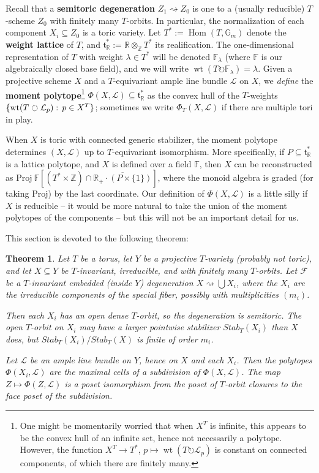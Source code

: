 \documentclass[11pt]{amsart}
\newtheorem{theorem}[Thm]{Theorem}
\theoremstyle{definition}
\DeclareMathOperator{\wt}{wt}
\DeclareMathOperator{\Hom}{Hom}
\newcommand{\RR}{\mathbb{R}}
\newcommand{\ZZ}{\mathbb{Z}}
\newcommand\defn[1]{{\bf #1}}
\newcommand\Union\bigcup
\newcommand\lie[1]{{\mathfrak #1}}
\newcommand\FF{{\mathbb F}}
\newcommand\tensor\otimes
\newcommand\calF{{\mathcal F}}
\newcommand\calL{{\mathcal L}}
\newcommand\Gm{{\mathbb G}_m}
\newcommand\actson\circlearrowright
\renewcommand{\colon}{\mathrel{:}}
\renewcommand{\colon}{:\mkern\thinmuskip}
\begin{document}
Recall that a \defn{semitoric degeneration} $Z_1 \rightsquigarrow Z_0$
is one to a (usually reducible) $T$-scheme $Z_0$ with finitely many $T$-orbits.
In particular, the normalization of each component $X_i \subseteq Z_0$
is a toric variety.
Let $T^* := \Hom(T,\Gm)$ denote the \defn{weight lattice} of $T$,
and $\lie t_\RR^* := \RR \tensor_\ZZ T^*$ its realification.
The one-dimensional representation of $T$ with weight $\lambda \in T^*$
will be denoted $\FF_\lambda$ (where $\FF$ is our algebraically closed
base field), and we will write $\wt(T\actson \FF_\lambda) = \lambda$.
Given a projective scheme $X$ and a $T$-equivariant ample line bundle
$\calL$ on $X$, we {\em define} the \defn{moment polytope}\footnote{%
  One might be momentarily worried that when $X^T$ is infinite, this appears to be
  the convex hull of an infinite set, hence not necessarily a polytope.
  However, the function $X^T \to T^*$, $p \mapsto \wt(T \actson \calL_p)$
  is constant on connected components, of which there are finitely many.}
$\Phi(X,\calL) \subseteq \lie t_\RR^*$ as the convex hull of the $T$-weights
$\{\wt(T \actson \calL_p) \colon p\in X^T\}$;
sometimes we write $\Phi_T(X,\calL)$ if there are multiple tori in play.

When $X$ is toric with connected generic stabilizer, the moment polytope
determines $(X,\calL)$ up to $T$-equivariant isomorphism. More specifically,
if $P \subseteq \lie t_\RR^*$ is a lattice polytope, and $X$ is defined
over a field $\FF$, then $X$ can be reconstructed as
${\mathrm {Proj}}\
\FF\left[(T^* \times \ZZ) \cap \overline{\RR_+\cdot (P \times \{1\})}\right]$,
where the monoid algebra is graded (for taking $\mathrm{Proj}$) by the last
coordinate. Our definition of $\Phi(X,\calL)$ is a little silly if $X$ is
reducible -- it would be more natural to take the union of the moment polytopes
of the components -- but this will not be an important detail for us.

This section is devoted to the following theorem:

\begin{theorem}\label{thm:subdivision-general}
  Let $T$ be a torus, let $Y$ be a projective $T$-variety (probably not toric),
  and let $X \subseteq Y$ be $T$-invariant, irreducible, and with
  finitely many $T$-orbits.  Let $\calF$ be a $T$-invariant
  embedded (inside $Y$) degeneration $X \rightsquigarrow \Union X_i$,
  where the $X_i$ are the irreducible components of the special fiber,
  possibly with multiplicities $(m_i)$. 
  
  Then each $X_i$ has an open dense $T$-orbit, so the degeneration is semitoric.
  The open $T$-orbit on $X_i$ may have a larger pointwise stabilizer
  $Stab_T(X_i)$ than $X$ does, but $Stab_T(X_i)/Stab_T(X)$ is
  finite of order $m_i$.

  Let $\calL$ be an ample line bundle on $Y$, hence on $X$ and each $X_i$.
  Then the polytopes $\Phi(X_i,\calL)$ are the maximal cells of a
  subdivision of $\Phi(X,\calL)$. The map $Z \mapsto \Phi(Z,\calL)$
  is a poset isomorphism from the poset of $T$-orbit closures to
  the face poset of the subdivision.
\end{theorem}
\end{document}
